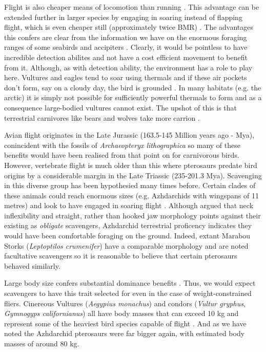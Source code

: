 \documentclass[a4paper,12pt]{article}
\begin{document}
Flight is also cheaper means of locomotion than running \citep{tucker1975energetic}. This advantage can be extended further in larger species by engaging in soaring instead of flapping flight, which is even cheaper still (approximately twice BMR) \citep{hedenstrom1993migration}. The advantages this confers are clear from the information we have on the enormous foraging ranges of some seabirds and accipiters \citep{bamford2007ranging}. Clearly, it would be pointless to have incredible detection abilites and not have a cost efficient movement to benefit from it. Although, as with detection ability, the environment has a role to play here. Vultures and eagles tend to soar using thermals and if these air pockets don't form, say on a cloudy day, the bird is grounded \citep{mundy1992vultures}. In many habitats (e.g. the arctic) it is simply not possible for sufficiently powerful thermals to form and as a consequence large-bodied vultures cannot exist. The upshot of this is that terrestrial carnivores like bears and wolves take more carrion \citep{devault2003scavenging}. 

Avian flight originates in the Late Jurassic (163.5-145 Million years ago - Mya), conincident with the fossils of \textit{Archaeopteryx lithographica} so many of these benefits would have been realised from that point on for carnivorous birds. However, vertebrate flight is much older than this where pterosaurs predate bird origins by a considerable margin in the Late Triassic (235-201.3 Mya). Scavenging in this diverse group has been hypothesied many times before. Certain clades of these animals could reach enormous sizes (e.g. Azhdarchids with wingspans of 11 metres)%
 and look to have engaged in soaring flight \citep{witton2010size}. Although \cite{witton2008reappraisal} argued that neck inflexibility and straight, rather than hooked jaw morphology points against their existing as \textit{obligate} scavengers, Azhdarchid terrestrial proficency indicates they would have been comfortable foraging on the ground. Indeed, extant Marabou Storks (\textit{Leptoptilos crumenifer}) %
have a comparable morphology and are noted facultative scavengers so it is reasonable to believe that certain pterosaurs behaved similarly.  

Large body size confers substantial dominance benefits \citep{ruxton2004obligate}. Thus, we would expect scavengers to have this trait selected for even in the case of weight-constrained fliers. Cinereous Vultures (\textit{Aegypius monachus}) and condors (\textit{Vultur gryphus}, \textit{Gymnogyps californianus}) all have body masses that can exceed 10 kg and represent some of the heaviest bird species capable of flight \citep{ferguson2001raptors,donazar2002effects}. And as we have noted the Azhdarchid pterosaurs were far bigger again, with estimated body masses of around 80 kg. %
 
\end{document}
